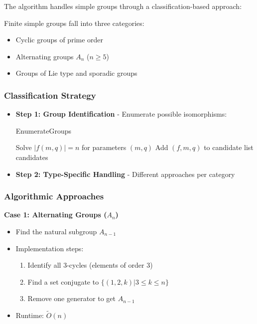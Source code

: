 \documentclass[sigconf]{acmart}
\begin{document}
The algorithm handles simple groups through a classification-based approach:

\begin{definition}
Finite simple groups fall into three categories:
\begin{itemize}
    \item Cyclic groups of prime order
    \item Alternating groups $A_n$ ($n \geq 5$)
    \item Groups of Lie type and sporadic groups
\end{itemize}
\end{definition}

\subsubsection{Classification Strategy}
\begin{itemize}
    \item \textbf{Step 1: Group Identification} - Enumerate possible isomorphisms:
    \begin{algorithm}[H]
    \caption{EnumerateGroups}
    \begin{algorithmic}[1]
        \STATE Solve $|f(m,q)| = n$ for parameters $(m,q)$
            \STATE Add $(f,m,q)$ to candidate list
        \ENDIF
    \ENDFOR
    \RETURN candidates
    \end{algorithmic}
    \end{algorithm}
    
    \item \textbf{Step 2: Type-Specific Handling} - Different approaches per category
\end{itemize}

\subsubsection{Algorithmic Approaches}

\textbf{Case 1: Alternating Groups ($A_n$)}
\begin{itemize}
    \item Find the natural subgroup $A_{n-1}$
    \item Implementation steps:
    \begin{enumerate}
        \item Identify all 3-cycles (elements of order 3)
        \item Find a set conjugate to $\{(1,2,k) | 3 \leq k \leq n\}$
        \item Remove one generator to get $A_{n-1}$
    \end{enumerate}
    \item Runtime: $\widetilde{O}(n)$
\end{itemize}
\end{document}
